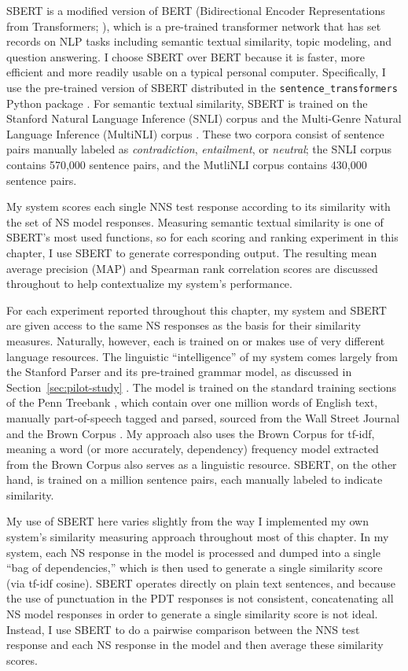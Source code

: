 SBERT is a modified version of BERT (Bidirectional Encoder Representations from Transformers; \citealp[][]{BertDevlin2018}), which is a pre-trained transformer network that has set records on NLP tasks including semantic textual similarity, topic modeling, and question answering. I choose SBERT over BERT because it is faster, more efficient and more readily usable on a typical personal computer. Specifically, I use the pre-trained version of SBERT distributed in the \texttt{sentence\_transformers} Python package \cite{sbert-python}. For semantic textual similarity, SBERT is trained on the Stanford Natural Language Inference (SNLI) corpus \cite{bowman2015} and the Multi-Genre Natural Language Inference (MultiNLI) corpus \cite{MultiNLI2018}. These two corpora consist of sentence pairs manually labeled as \textit{contradiction}, \textit{entailment}, or \textit{neutral}; the SNLI corpus contains 570,000 sentence pairs, and the MutliNLI corpus contains 430,000 sentence pairs.
 
My system scores each single NNS test response according to its similarity with the set of NS model responses. Measuring semantic textual similarity is one of SBERT's most used functions, so for each scoring and ranking experiment in this chapter, I use SBERT to generate corresponding output. The resulting mean average precision (MAP) and Spearman rank correlation scores are discussed throughout to help contextualize my system's performance.

For each experiment reported throughout this chapter, my system and SBERT are given access to the same NS responses as the basis for their similarity measures. Naturally, however, each is trained on or makes use of very different language resources. The linguistic ``intelligence'' of my system comes largely from the Stanford Parser and its pre-trained grammar model, as discussed in Section~\ref{sec:pilot-study} \cite{klein:manning:03}. The model is trained on the standard training sections of the Penn Treebank \cite{marcus-et-al:93}, which contain over one million words of English text, manually part-of-speech tagged and parsed, sourced from the Wall Street Journal and the Brown Corpus  \cite{kucera:francis:67}. My approach also uses the Brown Corpus for tf-idf, meaning a word (or more accurately, dependency) frequency model extracted from the Brown Corpus also serves as a linguistic resource. SBERT, on the other hand, is trained on a million sentence pairs, each manually labeled to indicate similarity.

My use of SBERT here varies slightly from the way I implemented my own system's similarity measuring approach throughout most of this chapter. In my system, each NS response in the model is processed and dumped into a single ``bag of dependencies,'' which is then used to generate a single similarity score (via tf-idf cosine). SBERT operates directly on plain text sentences, and because the use of punctuation in the PDT responses is not consistent, concatenating all NS model responses in order to generate a single similarity score is not ideal. Instead, I use SBERT to do a pairwise comparison between the NNS test response and each NS response in the model and then average these similarity scores.


